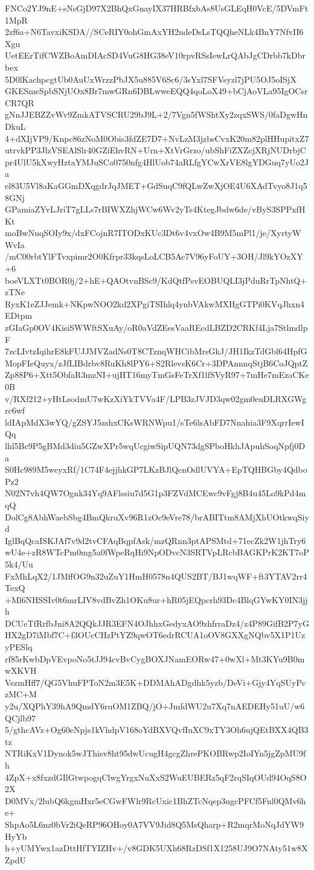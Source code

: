 FNCo2YJ9nE+sNsGjD97X2BhQxGnayIX37HRBfxbAs8UsGLEqH0VcE/5DVmFt1MpR
2zf6a+N6TavxiKSDA//SCeRIY0ohGmAxYH2ndeDsLsTQQheNLk4BnY7NfvII6Xgu
UetEErTifCWZBoAmDIAcSD4VuG8HG38eV10rpvRSsIewLrQAbJgCDrbb7kDbrbex
5D0lKachpcgtUb0AuUxWrzzPbJX5u885V6Sc6/3sYxl7SFVsyzl7jPU5OJ5oISjX
GKESmeSpbSNjUOx8Br7mwGRn6DBLwweEQQ4qoLoX49+bCjAoVLa95IgOCsrCR7QR
gNnJJEBZZvWv9ZmkATVSCRU29bJ9L+2/7Vgn5fWShtXy2zqxSWS/0faDgwHnDkuL
4+dXIjVP9/Knpc86zNoM0Obis3fdZE7D7+NvLzM3jzbsCvxK20m82plHHupitxZ7
utrvkPP3JlzVSEAlSlr40GZiEhvRN+Urn+XtVrGrzo/ubShFiZXZcjXRjNUDrbjC
pr4UlU5kXwyHztaYMJuSCa0750nfg4HlUob74aRLfgYCwXrVE8lgYDGuq7yUo2Ja
el83U5Vl8aKaGGmDXqgdrJqJMET+GdSuqC9fQLwZwXjOE4U6XAdTvyo8J1q58GNj
GPamiaZYvLJriT7gLLs7rBIWXZhjWCw6Wv2yTs4KtegJbdw6de/vByS3SPPxfHKt
moBwNnqSOIy9x/dxFCojnR7ITODxKUc3Dt6v4vxOw4B9M5mPl1/je/XyrtyWWvIa
/mC00rbtYlFTvxpimr2O0Kfrpr33kqsLoLCB5Ac7V96yFoUY+3OH/Jl9kYOzXY+6
boeVLXTt0BOR0j/2+hE+QAOtvnBSc9/KdQtfPsvEOBUQLI3jPduRrTpNhtQ+zTNe
RyxK1eZJJemk+NKpwNOO2kd2XPgiTSIhlq4ynbVAkwMXHgGTPi0KVqJhxn4EDtpm
zGIaGp0OV4KisiSWWftSXuAy/oR0aVdZEesVaaREcdLBZD2CRKf4Lja7StlmdlpF
7zcLIvtzIqihrE8kFUJJMVZadNs0T8CTznqWHCibMrsGkJ/JH1IkzTdGbl64HpfG
MopFIeQuyx/zJfLIBdrbv8RuKh8lPY6+S2RlevsK6Cr+3DPAnnnqStjB6CoJQptZ
Zp88P6+Xtt5ObfaR3mzNI+ujHT16myTmGsFeTrXf1lfSVyR97+7mHe7mEzaCKe0B
v/RXf212+yHtLsodmU7wKzXiYkTVVa4F/LPB3zJVJD3qw02gm0euDLRXGWgrc6wf
ldIApMdX3wYQ/gZSYJ5zshxCKsWRNWpu1/sTe6lsAbFD7Nnahia3F9XqrrIewIQq
lhl5Bc9P5gBMd3diu5GZwXPr5wqUcgiwSipUQN73dgSPboHkhJApuhSoqNpfj0Da
S0Hc989M5weyxRf/1C74F4ejjhkGP7LKzBJlQcnOdlUVYA+EpTQHBGby4QdboPz2
N02N7vh4QW7Ognk34Yq9AFlssiu7d5G1p3FZVdMCEwc9vFgj8B4u45Lo9kPd4mqQ
DolCg8AbhWaebSbg4BmQkruXv96R1zOc9eVre78/brABITtm8AMjXhUOtkwqSiyd
IglBqQcaISKJAf7v9d2tvCFAqBqpfAsk/mzQRnn3ptAPSMtd+71ecZk2W1jhTry6
wU4e+zR8WTcPm0mg5a0fWpeRqHi9NpODvcN3SRTVpLRcbBAGKPrK2KT7oP5k4/Uu
FxMhLqX2/1JMffOG9n32uZuY1HmH0578n4QUS2BT/BJ1wqWF+ft3YTAV2rr4TexQ
+Ml6NHSSIv0t6mrLIV8vdBvZh1OKu8ur+hR05jEQpcrh93Dc4BlqGYwKY0IN3jjh
DCUeTfRrfbJni8A2QQkJJR3EFN4OJhhxGedyxAO9zhfrraDz4/z4P89GifB2P7yG
HX2gD7iMbf7C+f3OUcCHzPtYZ9qwOT6edrRCUA1oOV8GXXgNQbv5X1P1UzyPESlq
rf85rKwbDpVEvpoNo5tJJ94cvBvCygBOXJNamEORw47+0wXl+Mt3KYu9B0mwXKVH
VszmHff7/QG5VhuFPToN2m3E5K+DDMAhADgdhk5yzb/DeVi+Gjy4YqSUyPczMC+M
y2u/XQPhY39hA9QmdY6ruOM1ZBQ/jO+JmfdWU2u7Xq7nAEDEHy51uU/w6QCjlb97
5/gthcAVz+Og60eNpjs1kVhdpV168oYdBXVQvfIuXC9xTY3Oh6ujQEtBXX4QB3tz
NTRiKxV1Dynok5wJThisv8ht95dwUcugH4gcgZhrePKOBRwp2IoIYn5jgZpMU9fh
4ZpX+x8fxzdGIlGtwpogqClwgYrgxNuXxS2WuEUBERz5qF2rqSIqOUd94OqS8O2X
D0MVx/2lubQ6kgmHxr5eCGwFWlr9RcUxic1BhZTcNqep3ugcPFCf5Fnl0QMv6he+
ShpAo5L6nz0bVr2iQeRP96OHoy0A7VV9Jid8Q5MsQharp+R2mqrMoNqJdYW9HyYb
h+yUMYwx1azDttHfTYIZHv+/v8GDK5UXh68RzDSf1X1258UJ9O7NAty51w8XZpdU
